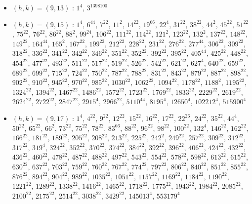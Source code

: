 \begin{itemize}
\item $(h,k)=(9,13)$ : $1^{4}$, $3^{1398100}$
\item $(h,k)=(9,15)$ : $1^{4}$, $6^{44}$, $7^{22}$, $11^{2}$, $14^{22}$, $19^{66}$, $22^{4}$, $31^{22}$, $38^{22}$, $44^{2}$, $45^{22}$, $51^{22}$, $75^{22}$, $76^{22}$, $86^{22}$, $88^{2}$, $99^{24}$, $106^{22}$, $111^{22}$, $114^{22}$, $121^{2}$, $123^{22}$, $132^{2}$, $137^{22}$, $148^{22}$, $149^{22}$, $164^{44}$, $165^{2}$, $167^{22}$, $199^{22}$, $212^{22}$, $228^{22}$, $231^{22}$, $276^{22}$, $277^{44}$, $306^{22}$, $309^{22}$, $318^{22}$, $336^{22}$, $341^{22}$, $342^{22}$, $346^{22}$, $351^{22}$, $352^{22}$, $392^{22}$, $395^{22}$, $405^{44}$, $425^{22}$, $448^{22}$, $454^{22}$, $477^{22}$, $493^{22}$, $511^{22}$, $517^{22}$, $519^{22}$, $526^{22}$, $542^{22}$, $621^{22}$, $627^{4}$, $640^{22}$, $659^{22}$, $689^{22}$, $699^{22}$, $715^{22}$, $724^{22}$, $750^{22}$, $787^{22}$, $788^{22}$, $831^{22}$, $843^{22}$, $879^{22}$, $887^{22}$, $898^{22}$, $902^{22}$, $910^{22}$, $945^{22}$, $970^{22}$, $985^{22}$, $1030^{22}$, $1062^{22}$, $1094^{22}$, $1178^{22}$, $1188^{2}$, $1195^{22}$, $1324^{22}$, $1394^{22}$, $1467^{22}$, $1486^{22}$, $1572^{22}$, $1723^{22}$, $1769^{22}$, $1833^{22}$, $2229^{22}$, $2619^{22}$, $2624^{22}$, $2722^{22}$, $2847^{22}$, $2915^{4}$, $2966^{22}$, $5110^{44}$, $8195^{4}$, $12650^{4}$, $102212^{4}$, $515900^{4}$
\item $(h,k)=(9,17)$ : $1^{4}$, $4^{22}$, $9^{22}$, $12^{22}$, $15^{22}$, $16^{22}$, $17^{22}$, $22^{26}$, $24^{22}$, $35^{22}$, $44^{4}$, $50^{22}$, $65^{22}$, $66^{2}$, $73^{22}$, $75^{22}$, $78^{22}$, $83^{66}$, $88^{22}$, $96^{22}$, $98^{22}$, $100^{22}$, $132^{4}$, $146^{22}$, $162^{22}$, $166^{22}$, $181^{22}$, $189^{22}$, $205^{22}$, $208^{22}$, $213^{22}$, $225^{22}$, $242^{2}$, $249^{22}$, $257^{22}$, $309^{22}$, $312^{22}$, $317^{22}$, $319^{4}$, $324^{22}$, $352^{22}$, $370^{22}$, $374^{22}$, $384^{22}$, $392^{22}$, $396^{22}$, $406^{22}$, $424^{22}$, $432^{22}$, $436^{22}$, $460^{22}$, $478^{22}$, $487^{22}$, $488^{22}$, $497^{22}$, $543^{22}$, $554^{22}$, $578^{22}$, $598^{22}$, $613^{22}$, $615^{22}$, $630^{22}$, $637^{22}$, $703^{22}$, $759^{22}$, $760^{22}$, $767^{22}$, $774^{22}$, $797^{22}$, $806^{22}$, $840^{22}$, $851^{22}$, $855^{22}$, $876^{22}$, $894^{22}$, $904^{22}$, $989^{22}$, $1035^{22}$, $1051^{22}$, $1157^{22}$, $1169^{22}$, $1184^{22}$, $1190^{22}$, $1221^{22}$, $1289^{22}$, $1338^{22}$, $1416^{22}$, $1465^{22}$, $1718^{22}$, $1775^{22}$, $1943^{22}$, $1984^{22}$, $2085^{22}$, $2100^{22}$, $2175^{22}$, $2514^{22}$, $3038^{22}$, $3429^{22}$, $145013^{4}$, $553179^{4}$

\end{itemize}
